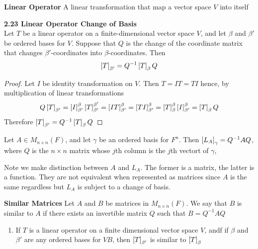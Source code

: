\documentclass[11pt]{article}
\begin{document}
\begin{defn*}
    \textbf{Linear Operator} A linear transformation that map a vector space $V$ into itself
\end{defn*}

\begin{theorem*}
    \textbf{2.23 Linear Operator Change of Basis} \\
    Let $T$ be a linear operator on a finite-dimensional vector space $V$, and let $\beta$ and $\beta'$ be ordered bases for $V$. Suppose that $Q$ is the change of the coordinate matrix that changes $\beta'$-coordinates into $\beta$-coordinates. Then 
    \[
        \left[ T \right]_{\beta'} = Q^{-1}\left[ T \right]_{\beta}Q    
    \]
    \begin{proof}
        Let $I$ be identity transformation on $V$. Then $T=IT=TI$ hence, by multiplication of linear transformations
        \[
            Q\left[ T \right]_{\beta'} = \left[ I \right]_{\beta'}^{\beta}\left[ T \right]_{\beta'}^{\beta'}
             = \left[ IT \right]_{\beta'}^{\beta} = \left[ TI \right]_{\beta'}^{\beta} 
             = \left[ T \right]_{\beta}^{\beta} \left[ I \right]_{\beta'}^{\beta} = \left[ T \right]_{\beta} Q
        \]
        Therefore $\left[ T \right]_{\beta'} = Q^{-1} \left[ T \right]_{\beta} Q$
    \end{proof}
\end{theorem*}

\begin{corollary*}
    Let $A\in M_{n\times n}(F)$, and let $\gamma$ be an ordered basis for $F^n$. Then $\left[ L_A \right]_{\gamma} = Q^{-1}AQ$, where $Q$ is the $n\times n$ matrix whose $j$th column is the $j$th vectort of $\gamma$, 
    \begin{rem}
        Note we make distinction between $A$ and $L_A$. The former is a matrix, the latter is a function. They are not equivalent when represented as matrices since $A$ is the same regardless but $L_A$ is subject to a change of basis. 
    \end{rem}    
\end{corollary*}

\begin{defn*}
    \textbf{Similar Matrices} Let $A$ and $B$ be matrices in $M_{n\times n}(F)$. We say that $B$ is similar to $A$ if there exists an invertible matrix $Q$ such that $B = Q^{-1}AQ$
    \begin{enumerate}
        \item If $T$ is a linear operator on a finite dimensional vector space $V$, andf if $\beta$ and $\beta'$ are any ordered bases for $VB$, then $\left[ T \right]_{\beta'}$ is similar to $\left[ T \right]_{\beta}$
    \end{enumerate}
\end{defn*}
\end{document}

